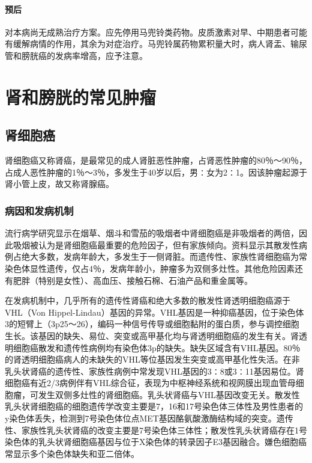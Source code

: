 \paragraph{预后}
对本病尚无成熟治疗方案。应先停用马兜铃类药物。皮质激素对早、中期患者可能有缓解病情的作用，其余为对症治疗。马兜铃属药物累积量大时，病人肾盂、输尿管和膀胱癌的发病率增高，应予注意。

\section{肾和膀胱的常见肿瘤}

\subsection{肾细胞癌}

肾细胞癌又称肾癌，是最常见的成人肾脏恶性肿瘤，占肾恶性肿瘤的80％～90％，占成人恶性肿瘤的1％～3％，多发生于40岁以后，男∶女为2∶1。因该肿瘤起源于肾小管上皮，故又称肾腺癌。

\subsubsection{病因和发病机制}

流行病学研究显示在烟草、烟斗和雪茄的吸烟者中肾细胞癌是非吸烟者的两倍，因此吸烟被认为是肾细胞癌最重要的危险因子，但有家族倾向。资料显示其散发性病例占绝大多数，发病年龄大，多发生于一侧肾脏。而遗传性、家族性肾细胞癌为常染色体显性遗传，仅占4％，发病年龄小，肿瘤多为双侧多灶性。其他危险因素还有肥胖（特别是女性）、高血压、接触石棉、石油产品和重金属等。

在发病机制中，几乎所有的遗传性肾癌和绝大多数的散发性肾透明细胞癌源于VHL（Von
Hippel-Lindau）基因的异常。VHL基因是一种抑癌基因，位于染色体3的短臂上（3p25～26），编码一种信号传导或细胞黏附的蛋白质，参与调控细胞生长。该基因的缺失、易位、突变或高甲基化均与肾透明细胞癌的发生有关。肾透明细胞癌散发和遗传性病例均有染色体3p的缺失。缺失区域含有VHL基因。80％的肾透明细胞癌病人的未缺失的VHL等位基因发生突变或高甲基化性失活。在非乳头状肾癌的遗传性、家族性病例中常发现VHL基因的3∶8或3∶11基因易位。肾细胞癌有近2/3病例伴有VHL综合征，表现为中枢神经系统和视网膜出现血管母细胞瘤，可发生双侧多灶性的肾细胞癌。乳头状肾癌与VHL基因改变无关。散发性乳头状肾细胞癌的细胞遗传学改变主要是7，16和17号染色体三体性及男性患者的y染色体丢失，检测到7号染色体位点MET基因酪氨酸激酶结构域的突变。遗传性、家族性乳头状肾癌的改变主要是7号染色体三体性；散发性乳头状肾癌存在1号染色体的乳头状肾细胞癌基因与位于X染色体的转录因子E3基因融合。嫌色细胞癌常显示多个染色体缺失和亚二倍体。

